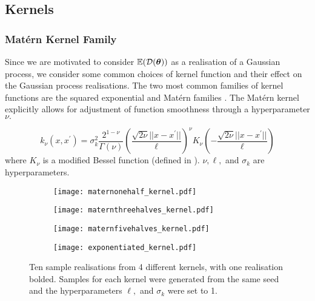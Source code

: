 \subsection*{Kernels}

\subsubsection*{Mat\'{e}rn Kernel Family}

Since we are motivated to consider $\operatorname{\mathbb{E}}(\mathcal{D}(\bm{\theta}))$ as a realisation of a
Gaussian process, we consider some common choices of kernel function and their
effect on the Gaussian process realisations. The two most common families of
kernel functions are the squared exponential
and Mat\'ern families \parencite{rasmussen_gaussian_2008}.
The Mat\'ern kernel explicitly allows for adjustment of function
smoothness through a hyperparameter $\nu.$

\begin{definition}
    $$k_\nu(x, x^\prime)
        = \sigma^2_k \frac{2^{1 - \nu}}{\Gamma(\nu)}
        \left(\frac{\sqrt{2\nu}||x - x^\prime||}{\ell}\right)^\nu
        K_\nu\left(-\frac{\sqrt{2\nu}||x - x^\prime||}{\ell}\right)$$
    where $K_\nu$ is a modified Bessel function
    (defined in \cite[374]{abramowitz_handbook_2013}). $\nu, \ell,$ and
    $\sigma_k$ are hyperparameters.
\end{definition}

\begin{figure}[htbp]
    \centering
    \begin{subfigure}[b]{0.5\textwidth}
        \centering
        \texttt{[image: maternonehalf\_kernel.pdf]}
        \label{fig:mat_one_half}
    \end{subfigure}%
    \hfill%
    \begin{subfigure}[b]{0.5\textwidth}
        \centering
        \texttt{[image: maternthreehalves\_kernel.pdf]}
        \label{fig:mat_three_halves}
    \end{subfigure}
    \begin{subfigure}[b]{0.5\textwidth}
        \centering
        \texttt{[image: maternfivehalves\_kernel.pdf]}
        \label{fig:mat_five_halves}
    \end{subfigure}%
    \hfill%
    \begin{subfigure}[b]{0.5\textwidth}
        \centering
        \texttt{[image: exponentiated\_kernel.pdf]}
        \label{fig:squared_exp}
    \end{subfigure}%
    \caption{
        Ten sample realisations from 4 different kernels, with one realisation
        bolded.
        Samples
        for each kernel were generated from the same seed and the
        hyperparameters $\ell,$ and $\sigma_k$ were set to 1.
    }
    \label{fig:kernels}
\end{figure}

